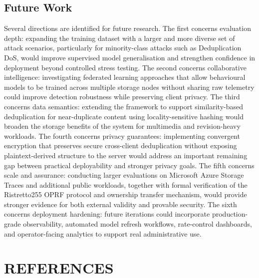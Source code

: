 \documentclass[12pt,a4paper,oneside]{report}
\begin{document}
\section{Future Work}

Several directions are identified for future research.
The first concerns evaluation depth: expanding the training dataset with a larger and more diverse set of attack scenarios, particularly for minority-class attacks such as Deduplication DoS, would improve supervised model generalisation and strengthen confidence in deployment beyond controlled stress testing.
The second concerns collaborative intelligence: investigating federated learning approaches that allow behavioural models to be trained across multiple storage nodes without sharing raw telemetry could improve detection robustness while preserving client privacy.
The third concerns data semantics: extending the framework to support similarity-based deduplication for near-duplicate content using locality-sensitive hashing would broaden the storage benefits of the system for multimedia and revision-heavy workloads.
The fourth concerns privacy guarantees: implementing convergent encryption that preserves secure cross-client deduplication without exposing plaintext-derived structure to the server would address an important remaining gap between practical deployability and stronger privacy goals.
The fifth concerns scale and assurance: conducting larger evaluations on Microsoft Azure Storage Traces and additional public workloads, together with formal verification of the Ristretto255 OPRF protocol and ownership transfer mechanism, would provide stronger evidence for both external validity and provable security.
The sixth concerns deployment hardening: future iterations could incorporate production-grade observability, automated model refresh workflows, rate-control dashboards, and operator-facing analytics to support real administrative use.

\chapter*{REFERENCES}
\end{document}
